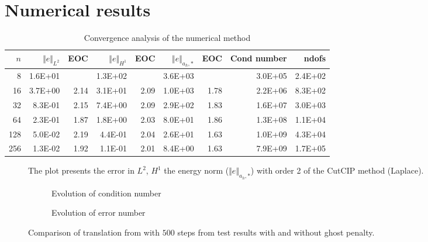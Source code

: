 
\newpage
\section{Numerical results}%
\label{sec:numerical_results}


\begin{table}[h!]
    \caption{Convergence analysis of the numerical method}
    \label{table:CutFEM_error1}
  \begin{tabular}{rrrrrrrrr}
    \hline\hline
    \textbf{$n$} & \textbf{$\Vert e \Vert_{L^2}$} & \textbf{EOC} & \textbf{$ \Vert e \Vert_{H^1}$} & \textbf{EOC} & \textbf{$\Vert e \Vert_{ a_h,* }$} & \textbf{EOC} & \textbf{Cond number} & \textbf{ndofs} \\\hline
    8 & 1.6E+01 &  & 1.3E+02 &  & 3.6E+03 &  & 3.0E+05 & 2.4E+02 \\
    16 & 3.7E+00 & 2.14 & 3.1E+01 & 2.09 & 1.0E+03 & 1.78 & 2.2E+06 & 8.3E+02 \\
    32 & 8.3E-01 & 2.15 & 7.4E+00 & 2.09 & 2.9E+02 & 1.83 & 1.6E+07 & 3.0E+03 \\
    64 & 2.3E-01 & 1.87 & 1.8E+00 & 2.03 & 8.0E+01 & 1.86 & 1.3E+08 & 1.1E+04 \\
    128 & 5.0E-02 & 2.19 & 4.4E-01 & 2.04 & 2.6E+01 & 1.63 & 1.0E+09 & 4.3E+04 \\
    256 & 1.3E-02 & 1.92 & 1.1E-01 & 2.01 & 8.4E+00 & 1.63 & 7.9E+09 & 1.7E+05 \\\hline\hline
  \end{tabular}

\end{table}

\begin{figure}[h!]
    \centering
    
    \caption{The plot presents the error in $L^2$, $H^1$ the energy norm ($\Vert e \Vert_{a_h,*}$) with order 2 of the CutCIP method (Laplace).}
    \label{fig:CutFEM_error1}
\end{figure}

\begin{figure}[h!]
    \centering
    \begin{subfigure}{\textwidth}
        \centering
        
        \caption{Evolution of condition number}
        \label{subfig:cond}
    \end{subfigure}
    \hfill
    \begin{subfigure}{\textwidth}
        \centering
        
        \caption{Evolution of error number}
        \label{subfig:error}
    \end{subfigure}
    \caption{Comparison of translation from with $500$ steps from test results with and without ghost penalty.}
    \label{fig:combined}
\end{figure}




